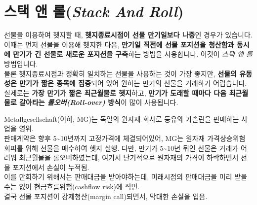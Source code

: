 \documentclass[
  letterpaper,
  DIV=11,
  numbers=noendperiod]{scrreprt}
\begin{document}
\section*{\texorpdfstring{스택 앤 롤(\emph{Stack And
Roll})}{스택 앤 롤(Stack And Roll)}}\label{uxc2a4uxd0dd-uxc564-uxb864stack-and-roll}


선물을 이용하여 헷지할 때, \textbf{헷지종료시점이 선물 만기일보다
나중}인 경우가 있습니다. 이때는 먼저 선물을 이용해 헷지한 다음,
\textbf{만기일 직전에 선물 포지션을 청산함과 동시에 만기가 긴 선물로
새로운 포지션을 구축}하는 방법을 사용합니다. 이것이 \emph{스택 앤 롤}
방법입니다.\\
물론 헷지종료시점과 정확히 일치하는 선물을 사용하는 것이 가장 좋지만,
\textbf{선물의 유동성은 만기가 짧은 종목에 집중}되어 있어 원하는 만기의
선물을 거래하기 어렵습니다. 실제로는 \textbf{가장 만기가 짧은 최근월물로
헷지}하고, \textbf{만기가 도래할 때마다 다음 최근월물로 갈아타는
\emph{롤오버(Roll-over)} 방식}이 많이 사용됩니다.

\begin{tcolorbox}[enhanced jigsaw, titlerule=0mm, bottomtitle=1mm, left=2mm, title=\textcolor{quarto-callout-tip-color}{\faLightbulb}\hspace{0.5em}{Stack and Roll의 위험성 : Metallgesellschaft 사례}, toptitle=1mm, bottomrule=.15mm, colframe=quarto-callout-tip-color-frame, breakable, opacityback=0, rightrule=.15mm, opacitybacktitle=0.6, coltitle=black, colback=white, arc=.35mm, colbacktitle=quarto-callout-tip-color!10!white, toprule=.15mm, leftrule=.75mm]

Metallgesellschaft(이하, MG)는 독일의 원자재 회사로 등유와 가솔린을
판매하는 사업을 영위.\\
판매계약은 향후 5\textasciitilde10년까지 고정가격에 체결되어있어, MG는
원자재 가격상승위험 회피를 위해 선물을 매수하여 헷지 실행. 다만, 만기가
5\textasciitilde10년 뒤인 선물은 거래가 어려워 최근월물을
롤오버하였는데, 여기서 단기적으로 원자재의 가격이 하락하면서 선물
포지션에서 손실이 누적됨.\\
이를 만회하기 위해서는 판매대금을 받아야하는데, 미래시점의 판매대금을
미리 받을 수는 없어 현금흐름위험(cashflow risk)에 직면.\\
결국 선물 포지션이 강제청산(margin call)되면서, 막대한 손실을 입음.

\end{tcolorbox}
\end{document}
